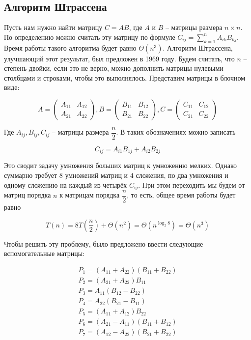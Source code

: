 \documentclass{article}
\begin{document}
\subsection*{Алгоритм Штрассена} 
Пусть нам нужно найти матрицу $C=AB$, где $A$ и $B$ -- матрицы размера $n\times n$. По определению можно считать эту матрицу по формуле $C_{ij}=\sum\limits_{k=1}^n A_{ik} B_{kj}$. Время работы такого алгоритма будет равно $\Theta(n^3)$. Алгоритм Штрассена, улучшающий этот результат, был предложен в 1969 году. Будем считать, что $n$ -- степень двойки, если это не верно, можно дополнить матрицы нулевыми столбцами и строками, чтобы это выполнялось. Представим матрицы в блочном виде:

$$A=\begin{pmatrix}A_{11} & A_{12} \\ A_{21} & A_{22}\end{pmatrix},
B=\begin{pmatrix}B_{11} & B_{12} \\ B_{21} & B_{22}\end{pmatrix},
C=\begin{pmatrix}C_{11} & C_{12} \\ C_{21} & C_{22}\end{pmatrix}$$

Где $A_{ij}, B_{ij}, C_{ij}$ -- матрицы размера $\dfrac n 2$. В таких обозначениях можно записать

$$C_{ij} = A_{i1} B_{1j} + A_{i2} B_{2j}$$

Это сводит задачу умножения больших матриц к умножению мелких. Однако суммарно требует $8$ умножений матриц и $4$ сложения, по два умножения и одному сложению на каждый из четырёх $C_{ij}$. При этом переходить мы будем от матриц порядка $n$ к матрицам порядка $\dfrac n 2$, то есть, общее время работы будет равно

$$T(n)=8T\left(\dfrac{n}{2}\right)+\Theta(n^2)=\Theta(n^{\log_2 8}) = \Theta(n^3)$$

Чтобы решить эту проблему, было предложено ввести следующие вспомогательные матрицы:

$$\begin{matrix}
P_1 = (A_{11} + A_{22})(B_{11}+B_{22}) \\
P_2 = (A_{21} + A_{22})B_{11} \\
P_3 = A_{11} (B_{12}-B_{22}) \\
P_4 = A_{22} (B_{21}-B_{11}) \\
P_5 = (A_{11} + A_{12})B_{22} \\
P_6 = (A_{21}-A_{11})(B_{11}+B_{12}) \\
P_7 = (A_{12}-A_{22})(B_{21}+B_{22})
\end{matrix}$$
\end{document}
